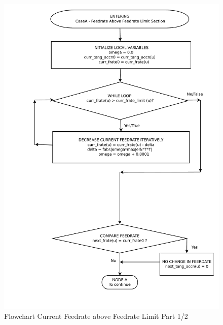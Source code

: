 \begin{figure}
	\caption{Flowchart Current Feedrate above Feedrate Limit Part 1/2}
	\label{02-CaseA1-Feedrate-Above-Limit-Main-Region-flowchart.pdf}
	\centering
	\includegraphics[width=1.10\textwidth,]{Images/Chap3/02-CaseA1-Feedrate-Above-Limit-Main-Region-flowchart.pdf} 
\end{figure}

\clearpage
\pagebreak

